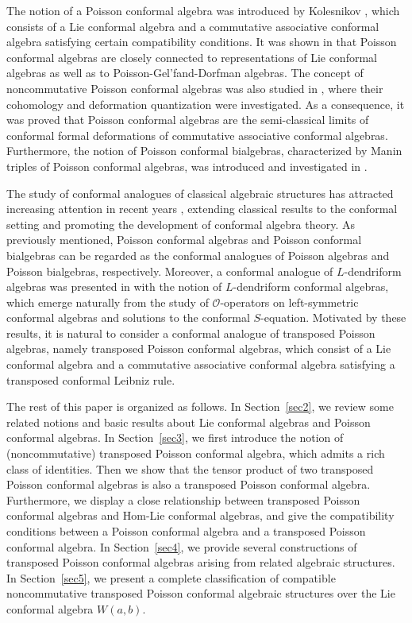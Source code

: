 \documentclass[11pt,letterpaper,reqno]{amsart}
\theoremstyle{definition}
\numberwithin{equation}{section}
\begin{document}
The notion of a Poisson conformal algebra was introduced by Kolesnikov \cite{Kol20}, which consists of a Lie conformal algebra and a commutative associative conformal algebra satisfying certain compatibility conditions.
It was shown in \cite{Kol20,LZ23} that Poisson conformal algebras are closely connected to representations of Lie conformal algebras as well as to Poisson-Gel'fand-Dorfman algebras.
The concept of noncommutative Poisson conformal algebras was also studied in \cite{LZ23}, where their cohomology and deformation quantization were investigated.
As a consequence, it was proved that Poisson conformal algebras are the semi-classical limits of conformal formal deformations of commutative associative conformal algebras.
Furthermore, the notion of Poisson conformal bialgebras, characterized by Manin triples of Poisson conformal algebras, was introduced and investigated in \cite{HB24}.

The study of conformal analogues of classical algebraic structures has attracted increasing attention in recent years \cite{sym24,HB2021}, extending classical results to the conformal setting and promoting the development of conformal algebra theory.
As previously mentioned, Poisson conformal algebras and Poisson conformal bialgebras can be regarded as the conformal analogues of Poisson algebras and Poisson bialgebras, respectively.
Moreover, a conformal analogue of $L$-dendriform algebras was presented in \cite{HY25} with the notion of $L$-dendriform conformal algebras, which emerge naturally from the study of $\mathcal{O}$-operators on left-symmetric conformal algebras and solutions to the conformal $S$-equation.
Motivated by these results, it is natural to consider a conformal analogue of transposed Poisson algebras, namely transposed Poisson conformal algebras, which consist of a Lie conformal algebra and a commutative associative conformal algebra satisfying a transposed conformal Leibniz rule.

The rest of this paper is organized as follows. In Section~\ref{sec2}, we review some related notions and basic results about Lie conformal algebras and Poisson conformal algebras.
In Section~\ref{sec3}, we first introduce the notion of (noncommutative) transposed Poisson conformal algebra, which admits a rich class of identities.
Then we show that the tensor product of two transposed Poisson conformal algebras is also a transposed Poisson conformal algebra.
Furthermore, we display a close relationship between transposed Poisson conformal algebras and Hom-Lie conformal algebras, and give the compatibility conditions between a Poisson conformal algebra and a transposed Poisson conformal algebra.
In Section~\ref{sec4}, we provide several constructions of transposed Poisson conformal algebras arising from related algebraic structures.
In Section~\ref{sec5}, we present a complete classification of compatible noncommutative transposed Poisson conformal algebraic structures over the Lie conformal algebra $W(a,b)$.
\end{document}
